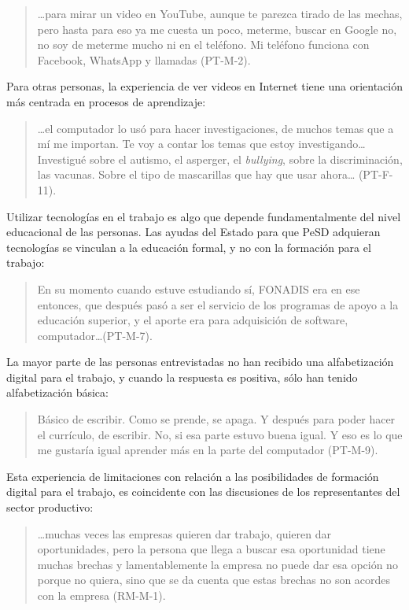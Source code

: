 \begin{quote}
	\ldots para mirar un video en YouTube, aunque te parezca tirado de las
	mechas, pero hasta para eso ya me cuesta un poco, meterme, buscar en
	Google no, no soy de meterme mucho ni en el teléfono. Mi teléfono
	funciona con Facebook, WhatsApp y llamadas (PT-M-2).
\end{quote}

Para otras personas, la experiencia de ver videos en Internet tiene una
orientación más centrada en procesos de aprendizaje:

\begin{quote}
	\ldots el computador lo usó para hacer investigaciones, de muchos temas que
	a mí me importan. Te voy a contar los temas que estoy investigando\ldots
	Investigué sobre el autismo, el asperger, el \emph{bullying}, sobre la
	discriminación, las vacunas. Sobre el tipo de mascarillas que hay que
	usar ahora\ldots{} (PT-F-11).
\end{quote}

Utilizar tecnologías en el trabajo es algo que depende fundamentalmente
del nivel educacional de las personas. Las ayudas del Estado para que
PeSD adquieran tecnologías se vinculan a la educación formal, y no con
la formación para el trabajo:

\begin{quote}
	En su momento cuando estuve estudiando sí, FONADIS era en ese entonces,
	que después pasó a ser el servicio de los programas de apoyo a la
	educación superior, y el aporte era para adquisición de software,
	computador\ldots (PT-M-7).
\end{quote}

La mayor parte de las personas entrevistadas no han recibido una
alfabetización digital para el trabajo, y cuando la respuesta es
positiva, sólo han tenido alfabetización básica:

\begin{quote}
	Básico de escribir. Como se prende, se apaga. Y después para poder hacer
	el currículo, de escribir. No, si esa parte estuvo buena igual. Y eso es
	lo que me gustaría igual aprender más en la parte del computador
	(PT-M-9).
\end{quote}

Esta experiencia de limitaciones con relación a las posibilidades de
formación digital para el trabajo, es coincidente con las discusiones de
los representantes del sector productivo:

\begin{quote}
	\ldots muchas veces las empresas quieren dar trabajo, quieren dar
	oportunidades, pero la persona que llega a buscar esa oportunidad tiene
	muchas brechas y lamentablemente la empresa no puede dar esa opción no
	porque no quiera, sino que se da cuenta que estas brechas no son acordes
	con la empresa (RM-M-1).
\end{quote}


